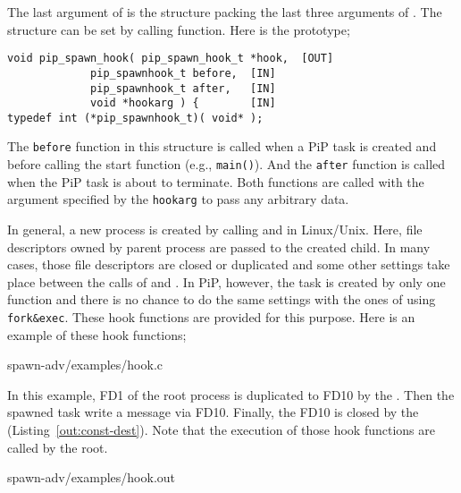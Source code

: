 The last argument of  is the structure
packing the last three arguments of . The
 structure can be set by calling
 function. Here is the prototype;

\begin{lstlisting}[frame=tb]
void pip_spawn_hook( pip_spawn_hook_t *hook,  [OUT]
		     pip_spawnhook_t before,  [IN]
		     pip_spawnhook_t after,   [IN]
		     void *hookarg ) {        [IN]
typedef int (*pip_spawnhook_t)( void* );
\end{lstlisting}

The {\tt before} function in this structure is called when a
PiP task is created and before calling the start function (e.g.,
{\tt main()}). And the {\tt after} function is called when the PiP
task is about to terminate. Both functions are called with the argument
specified by the {\tt hookarg} to pass any arbitrary data. 

In general, a new process is created by calling  and
 in Linux/Unix. Here, file descriptors owned by
parent process are passed to the created child. In many cases, those
file descriptors are closed or duplicated and some other settings take
place between the calls of  and
. In PiP, however, the task is created by only one
function and there is no chance to do the same settings with the ones
of using {\tt fork\&exec}. These hook functions are provided for this
purpose. Here is an example of these hook functions;  

 {spawn-adv/examples/hook.c}

In this example, FD1 of the root process is duplicated to FD10 by the
. Then the spawned task write a message via
FD10. Finally, the FD10 is closed by the 
(Listing~\ref{out:const-dest}). 
Note that the execution of those hook functions are called by the root. 


                {spawn-adv/examples/hook.out}
